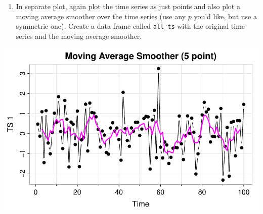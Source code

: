 \documentclass[
  letterpaper,
  DIV=11,
  numbers=noendperiod]{scrartcl}
\newenvironment{Shaded}{\begin{snugshade}}{\end{snugshade}}
\newcommand{\AttributeTok}[1]{\textcolor[rgb]{0.40,0.45,0.13}{#1}}
\newcommand{\DecValTok}[1]{\textcolor[rgb]{0.68,0.00,0.00}{#1}}
\newcommand{\FunctionTok}[1]{\textcolor[rgb]{0.28,0.35,0.67}{#1}}
\newcommand{\NormalTok}[1]{\textcolor[rgb]{0.00,0.23,0.31}{#1}}
\newcommand{\OtherTok}[1]{\textcolor[rgb]{0.00,0.23,0.31}{#1}}
\newcommand{\SpecialCharTok}[1]{\textcolor[rgb]{0.37,0.37,0.37}{#1}}
\newcommand{\StringTok}[1]{\textcolor[rgb]{0.13,0.47,0.30}{#1}}
\providecommand{\tightlist}{%
  \setlength{\itemsep}{0pt}\setlength{\parskip}{0pt}}\usepackage{longtable,booktabs,array}
\begin{document}
\begin{enumerate}
\def\labelenumi{\arabic{enumi}.}
\setcounter{enumi}{2}
\tightlist
\item
  In separate plot, again plot the time series as just points and also
  plot a moving average smoother over the time series (use any \(p\)
  you'd like, but use a symmetric one). Create a data frame called
  \texttt{all\_ts} with the original time series and the moving average
  smoother.
\end{enumerate}

\begin{Shaded}
\end{Shaded}

\includegraphics{Lecture7_files/figure-pdf/astsa_act2_p3-1.pdf}
\end{document}
